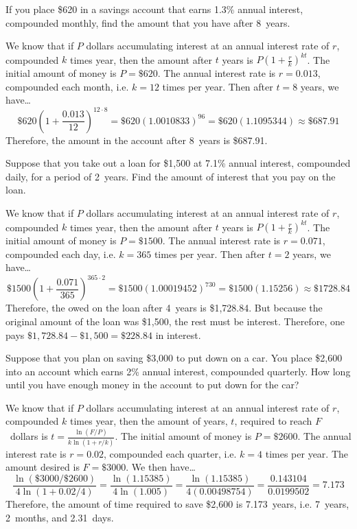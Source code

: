 \documentclass[11pt,letterpaper]{article}
\begin{document}

 If you place \$620 in a savings account that earns 1.3\% annual interest, compounded monthly, find the amount that you have after 8~years. \pspace

\sol We know that if $P$ dollars accumulating interest at an annual interest rate of $r$, compounded $k$ times year, then the amount after $t$ years is $P \left(1 + \frac{r}{k} \right)^{kt}$. The initial amount of money is $P= \$620$. The annual interest rate is $r= 0.013$, compounded each month, i.e. $k= 12$ times per year. Then after $t= 8$ years, we have\dots
	\[
	\$620 \left(1 + \dfrac{0.013}{12} \right)^{12 \cdot 8}= \$620 (1.0010833)^{96}= \$620(1.1095344) \approx \$687.91
	\]
Therefore, the amount in the account after 8~years is \$687.91. 



\newpage



 Suppose that you take out a loan for \$1,500 at 7.1\% annual interest, compounded daily, for a period of 2~years. Find the amount of interest that you pay on the loan. \pspace

\sol We know that if $P$ dollars accumulating interest at an annual interest rate of $r$, compounded $k$ times year, then the amount after $t$ years is $P \left(1 + \frac{r}{k} \right)^{kt}$. The initial amount of money is $P= \$1500$. The annual interest rate is $r= 0.071$, compounded each day, i.e. $k= 365$ times per year. Then after $t= 2$ years, we have\dots
	\[
	\$1500 \left(1 + \dfrac{0.071}{365} \right)^{365 \cdot 2}= \$1500 (1.00019452)^{730}= \$1500(1.15256) \approx \$1728.84
	\]
Therefore, the owed on the loan after 4~years is \$1,728.84. But because the original amount of the loan was \$1,500, the rest must be interest. Therefore, one pays $\$1,728.84 - \$1,500= \$228.84$ in interest. 



\newpage



 Suppose that you plan on saving \$3,000 to put down on a car. You place \$2,600 into an account which earns 2\% annual interest, compounded quarterly. How long until you have enough money in the account to put down for the car? \pspace

\sol We know that if $P$ dollars accumulating interest at an annual interest rate of $r$, compounded $k$ times year, then the amount of years, $t$, required to reach $F$~dollars is $t= \frac{\ln(F/P)}{k \ln(1+ r/k)}$. The initial amount of money is $P= \$2600$. The annual interest rate is $r= 0.02$, compounded each quarter, i.e. $k= 4$ times per year. The amount desired is $F= \$3000$. We then have\dots
	\[
	\dfrac{\ln(\$3000/\$2600)}{4 \ln(1 + 0.02/4)}= \dfrac{\ln(1.15385)}{4 \ln(1.005)}= \dfrac{\ln(1.15385)}{4(0.00498754)}= \dfrac{0.143104}{0.0199502}= 7.173
	\]
Therefore, the amount of time required to save \$2,600 is 7.173~years, i.e. 7~years, 2~months, and 2.31~days. 
\end{document}

